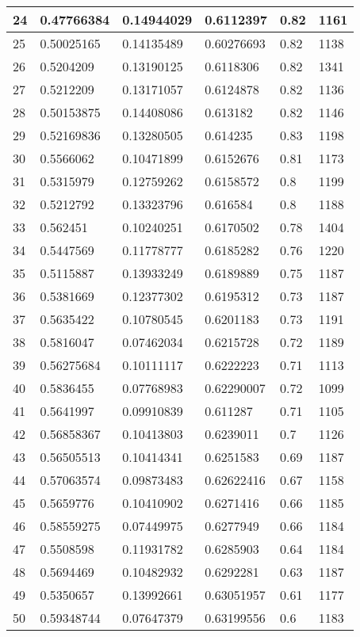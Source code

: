 \begin{longtable}{|l|l|l|l|l|l|}
24 & 0.47766384 & 0.14944029 & 0.6112397 & 0.82 & 1161 \\ \hline 
25 & 0.50025165 & 0.14135489 & 0.60276693 & 0.82 & 1138 \\ \hline 
26 & 0.5204209 & 0.13190125 & 0.6118306 & 0.82 & 1341 \\ \hline 
27 & 0.5212209 & 0.13171057 & 0.6124878 & 0.82 & 1136 \\ \hline 
28 & 0.50153875 & 0.14408086 & 0.613182 & 0.82 & 1146 \\ \hline 
29 & 0.52169836 & 0.13280505 & 0.614235 & 0.83 & 1198 \\ \hline 
30 & 0.5566062 & 0.10471899 & 0.6152676 & 0.81 & 1173 \\ \hline 
31 & 0.5315979 & 0.12759262 & 0.6158572 & 0.8 & 1199 \\ \hline 
32 & 0.5212792 & 0.13323796 & 0.616584 & 0.8 & 1188 \\ \hline 
33 & 0.562451 & 0.10240251 & 0.6170502 & 0.78 & 1404 \\ \hline 
34 & 0.5447569 & 0.11778777 & 0.6185282 & 0.76 & 1220 \\ \hline 
35 & 0.5115887 & 0.13933249 & 0.6189889 & 0.75 & 1187 \\ \hline 
36 & 0.5381669 & 0.12377302 & 0.6195312 & 0.73 & 1187 \\ \hline 
37 & 0.5635422 & 0.10780545 & 0.6201183 & 0.73 & 1191 \\ \hline 
38 & 0.5816047 & 0.07462034 & 0.6215728 & 0.72 & 1189 \\ \hline 
39 & 0.56275684 & 0.10111117 & 0.6222223 & 0.71 & 1113 \\ \hline 
40 & 0.5836455 & 0.07768983 & 0.62290007 & 0.72 & 1099 \\ \hline 
41 & 0.5641997 & 0.09910839 & 0.611287 & 0.71 & 1105 \\ \hline 
42 & 0.56858367 & 0.10413803 & 0.6239011 & 0.7 & 1126 \\ \hline 
43 & 0.56505513 & 0.10414341 & 0.6251583 & 0.69 & 1187 \\ \hline 
44 & 0.57063574 & 0.09873483 & 0.62622416 & 0.67 & 1158 \\ \hline 
45 & 0.5659776 & 0.10410902 & 0.6271416 & 0.66 & 1185 \\ \hline 
46 & 0.58559275 & 0.07449975 & 0.6277949 & 0.66 & 1184 \\ \hline 
47 & 0.5508598 & 0.11931782 & 0.6285903 & 0.64 & 1184 \\ \hline 
48 & 0.5694469 & 0.10482932 & 0.6292281 & 0.63 & 1187 \\ \hline 
49 & 0.5350657 & 0.13992661 & 0.63051957 & 0.61 & 1177 \\ \hline 
50 & 0.59348744 & 0.07647379 & 0.63199556 & 0.6 & 1183 \\ \hline 
\end{longtable}